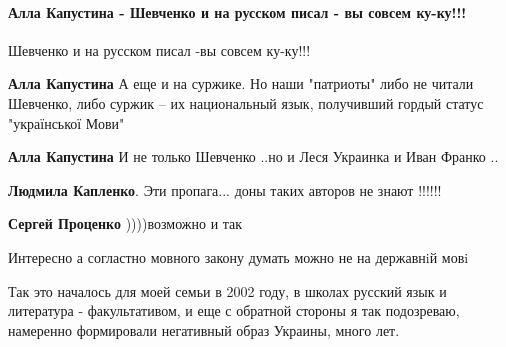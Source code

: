  
 
 
 
 
\paragraph{Алла Капустина - Шевченко и на русском писал - вы совсем ку-ку!!!}

\begin{itemize}
Шевченко и на русском писал -вы совсем ку-ку!!!


\begin{itemize}
\textbf{Алла Капустина}
А еще и на суржике. Но наши "патриоты" либо не читали Шевченко, либо суржик -- их национальный язык, получивший гордый статус "української Мови"

\textbf{Алла Капустина} И не только Шевченко ..но и Леся Украинка и Иван Франко ..

\textbf{Людмила Капленко}. Эти пропага... доны таких авторов не знают !!!!!!🤔🤔🤔🤔

\textbf{Сергей Проценко} ))))возможно и так
\end{itemize}

Интересно а согластно мовного закону думать можно не на державнiй мовi



Так это началось для моей семьи в 2002 году, в школах русский язык и литература
- факультативом, и еще с обратной стороны я так подозреваю, намеренно
формировали негативный образ Украины, много лет.





\end{itemize}
